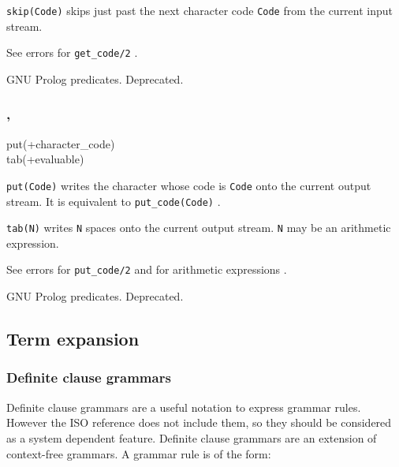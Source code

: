 \texttt{skip(Code)} skips just past the next character code \texttt{Code}
from the current input stream.

\Errors

See errors for \texttt{get\_code/2} .

\Portability

GNU Prolog predicates. Deprecated.

\subsubsection{,
               }

\begin{TemplatesOneCol}
put(+character\_code)\\
tab(+evaluable)

\end{TemplatesOneCol}

\Description

\texttt{put(Code)} writes the character whose code is \texttt{Code} onto the
current output stream. It is equivalent to \texttt{put\_code(Code)}
.

\texttt{tab(N)} writes \texttt{N} spaces onto the current output
stream. \texttt{N} may be an arithmetic expression.

\Errors

See errors for \texttt{put\_code/2}  and for arithmetic
expressions .

\Portability

GNU Prolog predicates. Deprecated.

\subsection{Term expansion}
\label{Term-expansion}

\subsubsection{Definite clause grammars}
\label{DCG}

Definite clause grammars are a useful notation to express grammar rules.
However the ISO reference does not include them, so they should be considered
as a system dependent feature. Definite clause grammars are an extension of
context-free grammars. A grammar rule is of the form:

